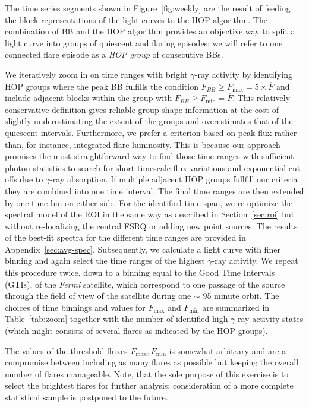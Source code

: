 \documentclass[twocolumn,linenumbers]{aastex62}
\newcommand{\gray}{$\gamma$-ray\xspace}
\newcommand{\Fermi}{\emph{Fermi}\xspace}
\begin{document}
The time series segments shown in 
Figure~\ref{fig:weekly} 
are the result of feeding
the block representations of the light curves to the HOP algorithm.
The combination of BB and the HOP algorithm provides an objective way to split a light curve into groups of quiescent and flaring episodes; we will refer to one connected flare episode as a \emph{HOP group} of consecutive BBs.

We iteratively zoom in on time ranges with bright \gray activity by identifying HOP groups where the peak BB fulfills the condition $F_{BB} \geqslant F_\mathrm{max} =  5\times\overline{F}$ and include adjacent blocks within the group with $F_{BB} \geqslant F_\mathrm{min} = \overline{F}$. 
This relatively conservative definition 
gives reliable group shape information 
at the cost of 
slightly underestimating the extent of the
groups and overestimates that of the quiescent 
intervals.
Furthermore, we prefer a criterion based on peak flux rather than, for instance, integrated flare luminosity.
This is because our approach promises the most straightforward way to find those time ranges with sufficient photon statistics to search for short timescale flux variations and exponential cut-offs due to \gray absorption.
If multiple  adjacent HOP groups fullfill our criteria they are combined into one time interval. 
The final time ranges are then extended by one time bin on either side.
For the identified time span, we re-optimize the spectral model of the ROI in the same way as described in Section~\ref{sec:roi} but without re-localizing the central FSRQ or adding new point sources. 
The results of the best-fit spectra for the different time ranges are provided in Appendix~\ref{sec:avg-spec}.
Subsequently, we calculate a light curve with finer binning and again select the time ranges of the highest \gray activity. We repeat this procedure twice, down to a binning equal to the Good Time Intervals (GTIs), of the \Fermi satellite, which correspond to one passage of the source through the field of view of the satellite during one $\sim$ 95 minute orbit.
The choices of time binnings and values for $F_\mathrm{max}$ and $F_\mathrm{min}$ are summarized in Table~\ref{tab:zoom} together with the number of identified high \gray activity states (which might consists of several flares as indicated by the HOP groups).

The values of the threshold fluxes $F_\mathrm{max}, F_\mathrm{min}$ is somewhat arbitrary and are a compromise between including as many flares as possible but keeping the overall number of flares manageable. Note, that the sole purpose of this exercise is to select the brightest flares for further analysis; consideration of a more
complete statistical sample is postponed to 
the future.
\end{document}
